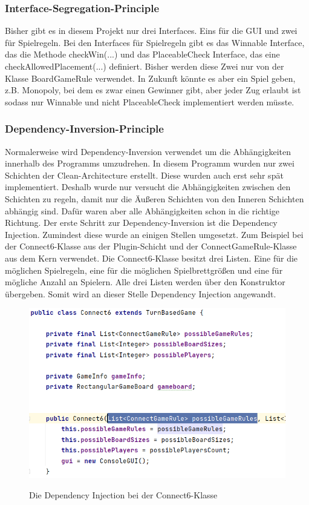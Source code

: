 \documentclass[12pt]{article}
\begin{document}
\subsubsection{Interface-Segregation-Principle}
Bisher gibt es in diesem Projekt nur drei Interfaces. Eins für die GUI und zwei für Spielregeln. Bei den Interfaces für Spielregeln gibt es das Winnable Interface, das die Methode checkWin(...) und das PlaceableCheck Interface, das eine checkAllowedPlacement(...) definiert. Bisher werden diese Zwei nur von der Klasse BoardGameRule verwendet. In Zukunft könnte es aber ein Spiel geben, z.B. Monopoly, bei dem es zwar einen Gewinner gibt, aber jeder Zug erlaubt ist sodass nur Winnable und nicht PlaceableCheck implementiert werden müsste.



\subsubsection{Dependency-Inversion-Principle}
Normalerweise wird Dependency-Inversion verwendet um die Abhängigkeiten innerhalb des Programms umzudrehen. In diesem Programm wurden nur zwei Schichten der Clean-Architecture erstellt. Diese wurden auch erst sehr spät implementiert. Deshalb wurde nur versucht die Abhängigkeiten zwischen den Schichten zu regeln, damit nur die Äußeren Schichten von den Inneren Schichten abhängig sind. Dafür waren aber alle Abhängigkeiten schon in die richtige Richtung.
Der erste Schritt zur Dependency-Inversion ist die Dependency Injection. Zumindest diese wurde an einigen Stellen umgesetzt. Zum Beispiel bei der Connect6-Klasse aus der Plugin-Schicht und der ConnectGameRule-Klasse aus dem Kern verwendet. Die Connect6-Klasse besitzt drei Listen. Eine für die möglichen Spielregeln, eine für die möglichen Spielbrettgrößen und eine für mögliche Anzahl an Spielern. Alle drei Listen werden über den Konstruktor übergeben. Somit wird an dieser Stelle Dependency Injection angewandt.


\begin{figure}[H]
\centering
{\includegraphics[width=13cm]{Bilder/DependencyInjection}}
\caption{Die Dependency Injection bei der Connect6-Klasse}
\label{fig:DependencyInjection}
\end{figure}
\end{document}
